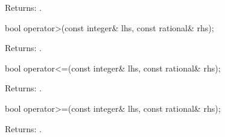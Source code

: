 \begin{itemdescr}
Returns: .
\end{itemdescr}

\begin{itemdecl}
bool operator>(const integer& lhs, const rational& rhs);
\end{itemdecl}

\begin{itemdescr}
Returns: .
\end{itemdescr}

\begin{itemdecl}
bool operator<=(const integer& lhs, const rational& rhs);
\end{itemdecl}

\begin{itemdescr}
Returns: .
\end{itemdescr}

\begin{itemdecl}
bool operator>=(const integer& lhs, const rational& rhs);
\end{itemdecl}

\begin{itemdescr}
Returns: .
\end{itemdescr}